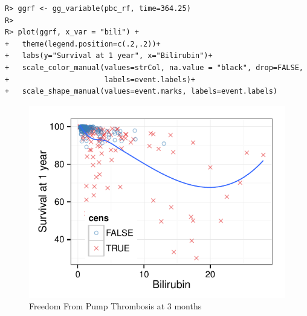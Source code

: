 \documentclass[nojss]{jss}
\begin{document}
\begin{knitrout}\footnotesize
{}\color{fgcolor}\begin{kframe}
\begin{verbatim}
R> ggrf <- gg_variable(pbc_rf, time=364.25)
R> 
R> plot(ggrf, x_var = "bili") +
+   theme(legend.position=c(.2,.2))+
+   labs(y="Survival at 1 year", x="Bilirubin")+
+   scale_color_manual(values=strCol, na.value = "black", drop=FALSE,
+                      labels=event.labels)+
+   scale_shape_manual(values=event.marks, labels=event.labels)
\end{verbatim}
\end{kframe}\begin{figure}[!htpb]

{\centering \includegraphics[width=\maxwidth]{figure/rfs-variable-plotbili-1} 

}

\caption[Freedom From Pump Thrombosis at 3 months]{Freedom From Pump Thrombosis at 3 months\label{fig:variable-plotbili}}
\end{figure}


\end{knitrout}
\end{document}
